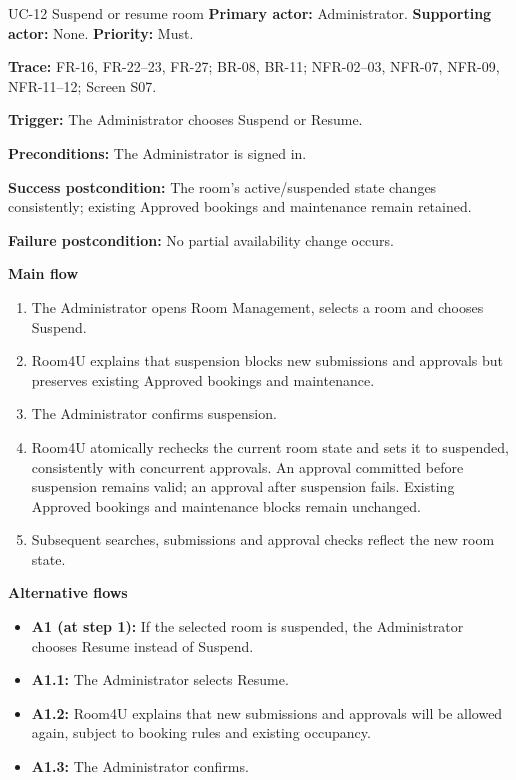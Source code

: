\begin{usecasebox}{UC-12 Suspend or resume room}
\noindent\textbf{Primary actor:} Administrator.\quad
\textbf{Supporting actor:} None.\quad
\textbf{Priority:} Must.\par
\textbf{Trace:} FR-16, FR-22--23, FR-27; BR-08, BR-11; NFR-02--03, NFR-07, NFR-09, NFR-11--12; Screen S07.\par
\textbf{Trigger:} The Administrator chooses Suspend or Resume.\par
\textbf{Preconditions:} The Administrator is signed in.\par
\textbf{Success postcondition:} The room's active/suspended state changes consistently; existing Approved bookings and maintenance remain retained.\par
\textbf{Failure postcondition:} No partial availability change occurs.\par
\textbf{Main flow}
\begin{enumerate}[label=\arabic*.,leftmargin=2em,itemsep=1pt,topsep=2pt]
  \item The Administrator opens Room Management, selects a room and chooses Suspend.
  \item Room4U explains that suspension blocks new submissions and approvals but preserves existing Approved bookings and maintenance.
  \item The Administrator confirms suspension.
  \item Room4U atomically rechecks the current room state and sets it to suspended, consistently with concurrent approvals. An approval committed before suspension remains valid; an approval after suspension fails. Existing Approved bookings and maintenance blocks remain unchanged.
  \item Subsequent searches, submissions and approval checks reflect the new room state.
\end{enumerate}
\textbf{Alternative flows}
\begin{itemize}[label={},leftmargin=0pt,itemsep=1pt,topsep=1pt]
  \item \textbf{A1 (at step 1):} If the selected room is suspended, the Administrator chooses Resume instead of Suspend.
  \item \textbf{A1.1:} The Administrator selects Resume.
  \item \textbf{A1.2:} Room4U explains that new submissions and approvals will be allowed again, subject to booking rules and existing occupancy.
  \item \textbf{A1.3:} The Administrator confirms.

\end{itemize}
\end{usecasebox}

